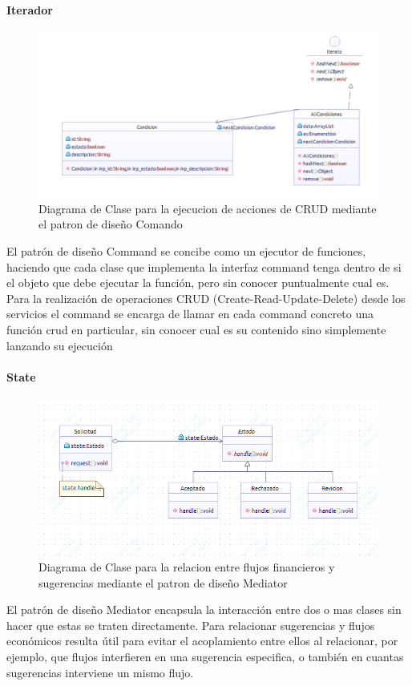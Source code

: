 \paragraph{Iterador}
\begin{figure}[H]
	\centering
	\includegraphics[width=1\linewidth]{parte2/imgs/Patrones/Iterador}
	\caption[Diagrama de clases del patrón Command]{Diagrama de Clase para la ejecucion de acciones de CRUD mediante el patron de diseño Comando}
	\label{fig:command}
\end{figure}

El patrón de diseño Command se concibe como un ejecutor de funciones, haciendo que cada clase que implementa la interfaz command tenga dentro de si el objeto que debe ejecutar la función, pero sin conocer puntualmente cual es. Para la realización de operaciones CRUD (Create-Read-Update-Delete) desde los servicios el command se encarga de llamar en cada command concreto una función crud en particular, sin conocer cual es su contenido sino simplemente lanzando su ejecución

\paragraph{State}
\begin{figure}[H]
	\centering
	\includegraphics[width=1\linewidth]{parte2/imgs/Patrones/Estado}
	\caption[Diagrama de clases del patrón Mediator]{Diagrama de Clase para la relacion entre flujos financieros y sugerencias mediante el patron de diseño Mediator}
	\label{fig:mediador}
\end{figure}

El patrón de diseño Mediator encapsula la interacción entre dos o mas clases sin hacer que estas se traten directamente. Para relacionar sugerencias y flujos económicos resulta útil para evitar el acoplamiento entre ellos al relacionar, por ejemplo, que flujos interfieren en una sugerencia especifica, o también en cuantas sugerencias interviene un mismo flujo.

